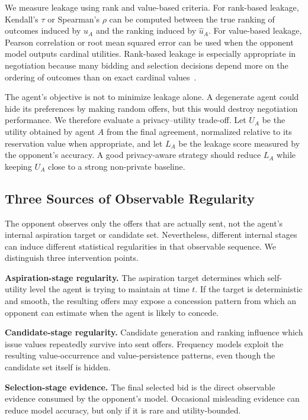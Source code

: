 \documentclass[runningheads]{llncs}
\begin{document}
We measure leakage using rank and value-based criteria. For rank-based leakage, Kendall's $\tau$ or Spearman's $\rho$ can be computed between the true ranking of outcomes induced by $u_A$ and the ranking induced by $\hat{u}_A$. For value-based leakage, Pearson correlation or root mean squared error can be used when the opponent model outputs cardinal utilities. Rank-based leakage is especially appropriate in negotiation because many bidding and selection decisions depend more on the ordering of outcomes than on exact cardinal values~\cite{survey_opponentmodel,MeasuringOM}.

The agent's objective is not to minimize leakage alone. A degenerate agent could hide its preferences by making random offers, but this would destroy negotiation performance. We therefore evaluate a privacy--utility trade-off. Let $U_A$ be the utility obtained by agent $A$ from the final agreement, normalized relative to its reservation value when appropriate, and let $L_A$ be the leakage score measured by the opponent's accuracy. A good privacy-aware strategy should reduce $L_A$ while keeping $U_A$ close to a strong non-private baseline.

\subsection{Three Sources of Observable Regularity}

The opponent observes only the offers that are actually sent, not the agent's internal aspiration target or candidate set. Nevertheless, different internal stages can induce different statistical regularities in that observable sequence. We distinguish three intervention points.

\textbf{Aspiration-stage regularity.} The aspiration target determines which self-utility level the agent is trying to maintain at time $t$. If the target is deterministic and smooth, the resulting offers may expose a concession pattern from which an opponent can estimate when the agent is likely to concede.

\textbf{Candidate-stage regularity.} Candidate generation and ranking influence which issue values repeatedly survive into sent offers. Frequency models exploit the resulting value-occurrence and value-persistence patterns, even though the candidate set itself is hidden.

\textbf{Selection-stage evidence.} The final selected bid is the direct observable evidence consumed by the opponent's model. Occasional misleading evidence can reduce model accuracy, but only if it is rare and utility-bounded.
\end{document}
